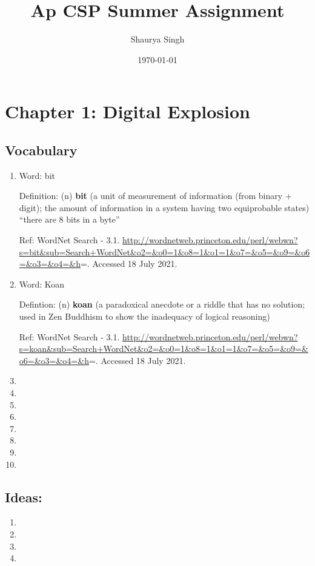 \documentclass[11pt]{article}
\author{Shaurya Singh}
\date{\today}
\title{Ap CSP Summer Assignment}
\begin{document}
\maketitle
\tableofcontents


\section{Chapter 1: Digital Explosion}
\label{sec:orgbe44ec3}
\subsection{Vocabulary}
\label{sec:org54008ee}
\begin{enumerate}
\item Word: bit

Definition: (n) \textbf{bit} (a unit of measurement of information (from binary + digit); the amount of information in a system having two equiprobable states) ``there are 8 bits in a byte''

Ref:
 WordNet Search - 3.1. \url{http://wordnetweb.princeton.edu/perl/webwn?s=bit\&sub=Search+WordNet\&o2=\&o0=1\&o8=1\&o1=1\&o7=\&o5=\&o9=\&o6=\&o3=\&o4=\&h}=. Accessed 18 July 2021.

\item Word: Koan

Defintion: (n) \textbf{koan} (a paradoxical anecdote or a riddle that has no solution; used in Zen Buddhism to show the inadequacy of logical reasoning)

Ref:
WordNet Search - 3.1. \url{http://wordnetweb.princeton.edu/perl/webwn?s=koan\&sub=Search+WordNet\&o2=\&o0=1\&o8=1\&o1=1\&o7=\&o5=\&o9=\&o6=\&o3=\&o4=\&h}=. Accessed 18 July 2021.

\item 

\item 

\item 

\item 

\item 

\item 

\item 

\item 
\end{enumerate}
\subsection{Ideas:}
\label{sec:org3252e3d}
\begin{enumerate}
\item 

\item 

\item 

\item 
\end{enumerate}
\end{document}
